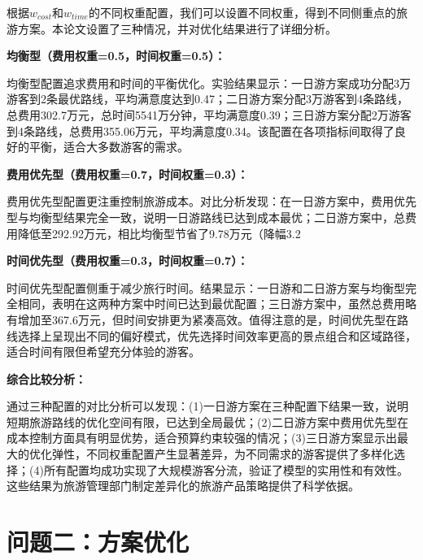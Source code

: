 根据$w_{cost}$和$w_{time}$的不同权重配置，我们可以设置不同权重，得到不同侧重点的旅游方案。本论文设置了三种情况，并对优化结果进行了详细分析。

\textbf{均衡型（费用权重=0.5，时间权重=0.5）：}

均衡型配置追求费用和时间的平衡优化。实验结果显示：一日游方案成功分配3万游客到2条最优路线，平均满意度达到0.47；二日游方案分配3万游客到4条路线，总费用302.7万元，总时间5541万分钟，平均满意度0.39；三日游方案分配2万游客到4条路线，总费用355.06万元，平均满意度0.34。该配置在各项指标间取得了良好的平衡，适合大多数游客的需求。

\textbf{费用优先型（费用权重=0.7，时间权重=0.3）：}

费用优先型配置更注重控制旅游成本。对比分析发现：在一日游方案中，费用优先型与均衡型结果完全一致，说明一日游路线已达到成本最优；二日游方案中，总费用降低至292.92万元，相比均衡型节省了9.78万元（降幅3.2%

\textbf{时间优先型（费用权重=0.3，时间权重=0.7）：}

时间优先型配置侧重于减少旅行时间。结果显示：一日游和二日游方案与均衡型完全相同，表明在这两种方案中时间已达到最优配置；三日游方案中，虽然总费用略有增加至367.6万元，但时间安排更为紧凑高效。值得注意的是，时间优先型在路线选择上呈现出不同的偏好模式，优先选择时间效率更高的景点组合和区域路径，适合时间有限但希望充分体验的游客。

\textbf{综合比较分析：}

通过三种配置的对比分析可以发现：(1)一日游方案在三种配置下结果一致，说明短期旅游路线的优化空间有限，已达到全局最优；(2)二日游方案中费用优先型在成本控制方面具有明显优势，适合预算约束较强的情况；(3)三日游方案显示出最大的优化弹性，不同权重配置产生显著差异，为不同需求的游客提供了多样化选择；(4)所有配置均成功实现了大规模游客分流，验证了模型的实用性和有效性。这些结果为旅游管理部门制定差异化的旅游产品策略提供了科学依据。



\section[\hspace{-2pt}问题二：方案优化]{{\heiti{} \hspace{-8pt}问题二：方案优化}}\label{section3: 问题2：方案优化}

